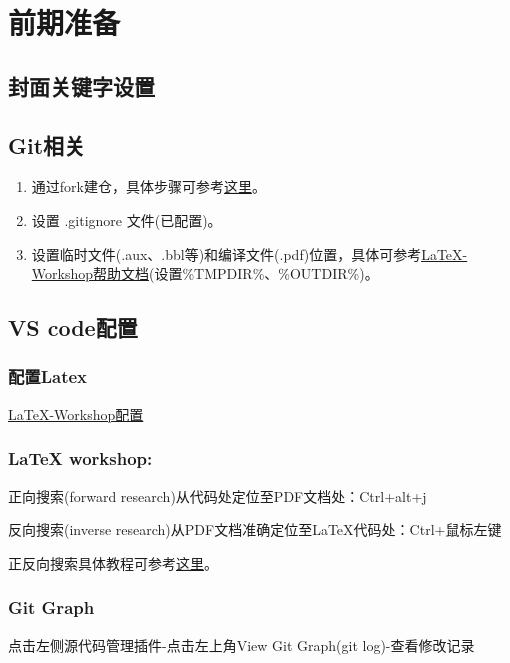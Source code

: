 \documentclass[engineeringmaster]{hquThesis}
\begin{document}
\makecover
% 
% 

\frontmatter{
    
    \tableofcontents
}

\mainmatter
\chapter{前期准备}
\section{封面关键字设置}
\section{Git相关}
\begin{enumerate}
    \item 通过fork建仓，具体步骤可参考\href{https://docs.github.com/en/repositories/creating-and-managing-repositories/creating-a-template-repository}{这里}。
    \item 设置 .gitignore 文件(已配置)。
\item 设置临时文件(.aux、.bbl等)和编译文件(.pdf)位置，具体可参考\href{https://github.com/James-Yu/LaTeX-Workshop/wiki/Compile#latex-tools}{LaTeX-Workshop帮助文档}(设置\%TMPDIR\%、\%OUTDIR\%)。
\end{enumerate}

\section{VS code配置}
\subsection*{配置Latex}
\href{https://github.com/James-Yu/LaTeX-Workshop/wiki/Compile#latex-tools}{LaTeX-Workshop配置}
\subsection*{LaTeX workshop: }

正向搜索(forward research)从代码处定位至PDF文档处：Ctrl+alt+j

反向搜索(inverse research)从PDF文档准确定位至LaTeX代码处：Ctrl+鼠标左键

正反向搜索具体教程可参考\href{https://github.com/James-Yu/LaTeX-Workshop/wiki/View#synctex}{这里}。
\subsection*{Git Graph}
点击左侧源代码管理插件-点击左上角View Git Graph(git log)-查看修改记录
\end{document}
